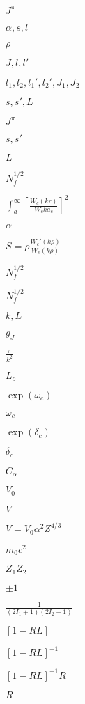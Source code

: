 \documentclass{article}
\begin{document}
$J^\pi$
\pagebreak

$ \alpha,s,l $
\pagebreak

$ \rho $
\pagebreak

$ J,l,l' $
\pagebreak

$ l_1,l_2,l_1',l_2',J_1,J_2 $
\pagebreak

$ s,s',L $
\pagebreak

$ J^\pi $
\pagebreak

$ s,s' $
\pagebreak

$ L $
\pagebreak

$ N_f^{1/2} $
\pagebreak

$ \int_a^\infty \left[ \frac{W_c(kr)}{W_c{ka_c}} \right]^2 $
\pagebreak

$ \alpha $
\pagebreak

$ S=\rho \frac{W_c'(k\rho)}{W_c(k\rho)} $
\pagebreak

$N_f^{1/2} $
\pagebreak

$N_f^{1/2}$
\pagebreak

$ k,L $
\pagebreak

$ g_J $
\pagebreak

$ \frac{\pi}{k^2} $
\pagebreak

$ L_o $
\pagebreak

$ \exp(\omega_c) $
\pagebreak

$ \omega_c $
\pagebreak

$ \exp(\delta_c) $
\pagebreak

$ \delta_c $
\pagebreak

$ C_\alpha $
\pagebreak

$V_0$
\pagebreak

$V$
\pagebreak

$V = V_0 \alpha^2 Z^{4/3}$
\pagebreak

$m_0c^2$
\pagebreak

$ Z_1 Z_2 $
\pagebreak

$ \pm1 $
\pagebreak

$ \frac{1}{(2I_1+1)(2I_2+1)} $
\pagebreak

$ [1-RL] $
\pagebreak

$ [1-RL]^{-1} $
\pagebreak

$ [1-RL]^{-1}R $
\pagebreak

$ R $
\pagebreak
\end{document}
